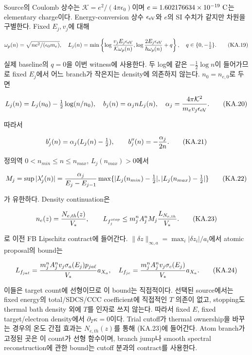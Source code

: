 \documentclass[11pt,a4paper]{article}
\begin{document}
Source의 Coulomb 상수는 \(\mathcal K=e^2/(4\pi\epsilon_0)\)이며 \(e=1.602176634\times10^{-19}\ {\rm C}\)는 elementary charge이다. Energy-conversion 상수 \(\epsilon_{\rm eV}\)와 \(e\)의 SI 수치가 같지만 차원을 구별한다. Fixed \(E_j,v_j\)에 대해

\[
 \omega_p(n)=\sqrt{ne^2/(\epsilon_0m_e)},\quad
 L_j(n)=\min\left\{
 \log{v_jE_j\epsilon_{\rm eV}\over\mathcal K\omega_p(n)},
 \log{2E_j\epsilon_{\rm eV}\over\hbar\omega_p(n)}+q
 \right\},\quad q\in\{0,-\tfrac12\}.
 \tag{KA.19}
\]

실제 baseline의 \(q=0\)을 이번 witness에 사용한다. 두 log에 같은 \(-\frac12\log n\)이 들어가므로 fixed \(E_j\)에서 어느 branch가 작은지는 density에 의존하지 않는다. \(n_0=n_{e,0}\)로 두면

\[
 L_j(n)=L_j(n_0)-\tfrac12\log(n/n_0),\quad
 b_j(n)=\alpha_jnL_j(n),\quad
 \alpha_j={4\pi\mathcal K^2\over m_ev_j\epsilon_{\rm eV}}.
 \tag{KA.20}
\]

따라서

\[
 b'_j(n)=\alpha_j(L_j(n)-\tfrac12),\qquad
 b''_j(n)=-{\alpha_j\over2n}.
 \tag{KA.21}
\]

정의역 \(0<n_{min}\le n\le n_{max}\), \(L_j(n_{max})>0\)에서

\[
 M_j=\sup|\lambda'_j(n)|
 ={\alpha_j\over E_j-E_{j-1}}
 \max\{|L_j(n_{min})-\tfrac12|,|L_j(n_{max})-\tfrac12|\}
 \tag{KA.22}
\]

가 유한하다. Density continuation은

\[
 n_e(z)={N_{e,th}(z)\over V_*},\qquad
 L_{f_j^{stop}}\le m_j^n A_j^n M_j {L_{N_{e,th}}\over V_*}.
 \tag{KA.23}
\]

로 이전 FB Lipschitz contract에 들어간다. \(\|\delta z\|_{\infty,a}=\max_i|\delta z_i|/a_i\)에서 atomic proposal의 bound는

\[
 L_{f_{ja\ell}}={m_j^n A_j^n v_j\sigma_a(E_j)p_{ja\ell}\over V_*}a_{X_a},
 \quad
 L_{f_{jc}}={m_j^n A_j^n v_j\sigma_c(E_j)\over V_*}a_{X_a}.
 \tag{KA.24}
\]

이들은 target count에 선형이므로 이 bound는 직접적이다. 선택된 source에서는 fixed energy의 total/SDCS/CCC coefficient에 직접적인 \(T\) 의존이 없고, stopping도 thermal bath density 외에 \(T\)를 인자로 쓰지 않는다. 따라서 fixed \(E\), fixed target/electron density에서 \(\partial_T\kappa=0\)이다. Trial cutoff가 thermal ownership을 바꾸는 경우의 온도 간접 효과는 \(N_{e,th}(z)\)를 통해 (KA.23)에 들어간다. Atom branch가 고정된 곳은 이 count가 선형 함수이며, branch jump나 smooth spectral reconstruction에 관한 bound는 cutoff 분과의 contract를 사용한다.
\end{document}
